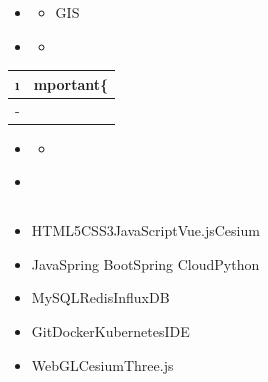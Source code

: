 \important{ }

\begin{itemize}
\item
  \begin{itemize}
  \tightlist
  \item
    GIS
  \end{itemize}
\item
  \begin{itemize}
  \tightlist
  \item
  \end{itemize}
\end{itemize}

\begin{longtable}[]{@{}ll@{}}
\toprule\noalign{}
\i & mportant\{ } \\
\midrule\noalign{}
\endhead
\bottomrule\noalign{}
\endlastfoot
- & \important{ } \\
\end{longtable}

\begin{itemize}
\item
  \begin{itemize}
  \tightlist
  \item
  \end{itemize}
\item ~
  \hypertarget{section-9}{%
  \subsection{}\label{section-9}}
\end{itemize}

\hypertarget{section-10}{%
\subsubsection{}\label{section-10}}

\begin{itemize}
\tightlist
\item
  \important{}HTML5CSS3JavaScriptVue.jsCesium
\item
  \important{}JavaSpring BootSpring CloudPython
\item
  \important{}MySQLRedisInfluxDB
\item
  \important{}GitDockerKubernetesIDE
\item
  \important{}WebGLCesiumThree.js
\end{itemize}

\hypertarget{section-11}{%
\subsubsection{}\label{section-11}}

